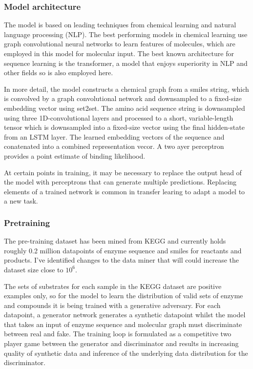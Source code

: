 \documentclass{article}
\begin{document}
\subsubsection{Model architecture}
The model is based on leading techniques from chemical learning and natural language processing (NLP). The best performing models in chemical learning use graph convolutional neural networks to learn features of molecules, which are employed in this model for molecular input. The best known architecture for sequence learning is the transformer, a model that enjoys superiority in NLP and other fields so is also employed here.  %
\par
In more detail, the model constructs a chemical graph from a smiles string, which is convolved by a graph convolutional network and downsampled to a fixed-size embedding vector using set2set. The amino acid sequence string is downsampled using three 1D-convolutional layers and processed to a short, variable-length tensor which is downsampled into a fixed-size vector using the final hidden-state from an LSTM layer. %
The learned embedding vectors of the sequence and conatenated into a combined representation vecor. A two ayer perceptron provides a point estimate of binding likelihood. %
\par
At certain points in training, it may be necessary to replace the output head of the model with perceptrons that can generate multiple predictions. Replacing elements of a trained network is common in transfer learing to adapt a model to a new task.

\subsubsection{Pretraining}
\par
The pre-training dataset has been mined from KEGG and currently holds roughly 0.2 million datapoints of enzyme sequence and smiles for reactants and products. I've identified changes to the data miner that will could increase the dataset size close to $10^6$.  %
\par
The sets of substrates for each sample in the KEGG dataset are positive examples only, so for the model to learn the distribution of valid sets of enzyme and compounds it is being trained with a generative adversary. For each datapoint, a generator network generates a synthetic datapoint whilst the model that takes an input of enzyme sequence and molecular graph must discriminate between real and fake. The training loop is formulated as a competitive two player game between the generator and discriminator and results in increasing quality of synthetic data and inference of the underlying data distribution for the discriminator. %
\end{document}
